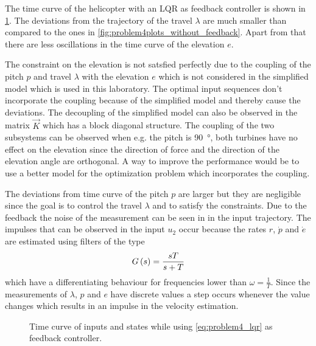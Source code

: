 The time curve of the helicopter with an LQR as feedback controller is shown in \cref{fig:problem4plot_511111_11}. The deviations from the trajectory of the travel $\lambda$ are much smaller than compared to the ones in \cref{fig:problem4plots_without_feedback}. Apart from that there are less oscillations in the time curve of the elevation $e$. 

The constraint on the elevation is not satsfied perfectly due to the coupling of the pitch $p$ and travel $\lambda$ with the elevation $e$ which is not considered in the simplified model which is used in this laboratory. The optimal input sequences don't incorporate the coupling because of the simplified model and thereby cause the deviations. The decoupling of the simplified model can also be observed in the matrix $\vec{K}$ which has a block diagonal structure. The coupling of the two subsystems can be observed when e.g. the pitch is \SI{90}{\degree}, both turbines have no effect on the elevation since the direction of force and the direction of the elevation angle are orthogonal. A way to improve the performance would be to use a better model for the optimization problem which incorporates the coupling.

The deviations from time curve of the pitch $p$ are larger but they are negligible since the goal is to control the travel $\lambda$ and to satisfy the constraints. Due to the feedback the noise of the measurement can be seen in in the input trajectory. The impulses that can be observed in the input $u_2$ occur because the rates $r$, $\dot{p}$ and $\dot{e}$ are estimated using filters of the type 
\begin{equation}
G\left(s\right)=\frac{sT}{s+T}
\end{equation}
which have a differentiating behaviour for frequencies lower than $\omega=\frac{1}{T}$. Since the measurements of $\lambda$, $p$ and $e$ have discrete values a step occurs whenever the value changes which results in an impulse in the velocity estimation.

\begin{figure}[htbp]
	\centering
	\caption{Time curve of inputs and states while using \eqref{eq:problem4_lqr} as feedback controller.}
	\label{fig:problem4plot_511111_11}%
\end{figure}

